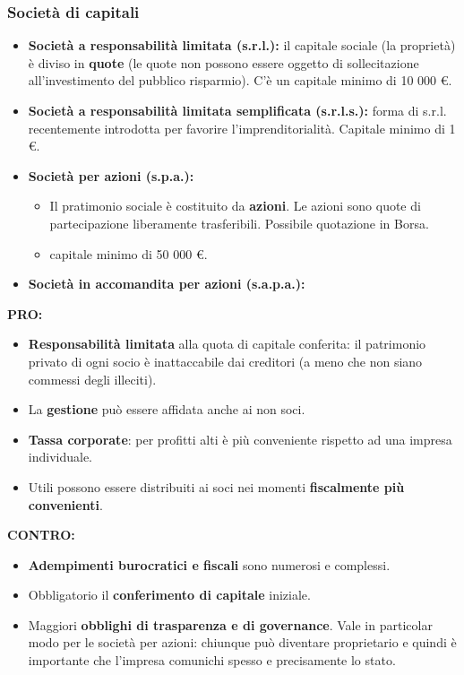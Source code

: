 \documentclass[../main.tex]{subfiles}
\begin{document}
\subsubsection{Società di capitali}

\begin{itemize}
	\item \textbf{Società a responsabilità limitata (s.r.l.):} il capitale sociale (la proprietà) è diviso in \textbf{quote} (le quote non possono essere oggetto di sollecitazione all'investimento del pubblico risparmio). C'è un capitale minimo di 10 000 \euro.

	\item \textbf{Società a responsabilità limitata semplificata (s.r.l.s.):} forma di s.r.l. recentemente introdotta per favorire l'imprenditorialità. Capitale minimo di 1 \euro.

	\item \textbf{Società per azioni (s.p.a.):}

	      \begin{itemize}
		      \item
		            Il pratimonio sociale è costituito da \textbf{azioni}. Le azioni sono quote di partecipazione liberamente trasferibili. Possibile quotazione in Borsa.
		      \item capitale minimo di 50 000 \euro.
	      \end{itemize}

	\item \textbf{Società in accomandita per azioni (s.a.p.a.):}

\end{itemize}

\textbf{PRO:}
\begin{itemize}
	\item \textbf{Responsabilità limitata} alla quota di capitale conferita: il patrimonio privato di ogni socio è inattaccabile dai creditori (a meno che non siano commessi degli illeciti).
	\item La \textbf{gestione} può essere affidata anche ai non soci.
	\item \textbf{Tassa corporate}: per profitti alti è più conveniente rispetto ad una impresa individuale.
	\item Utili possono essere distribuiti ai soci nei momenti \textbf{fiscalmente più convenienti}.

\end{itemize}

\textbf{CONTRO:}
\begin{itemize}
	\item \textbf{Adempimenti burocratici e fiscali} sono numerosi e complessi.
	\item Obbligatorio il \textbf{conferimento di capitale} iniziale.
	\item Maggiori \textbf{obblighi di trasparenza e di governance}. Vale in particolar modo per le società per azioni: chiunque può diventare proprietario e quindi è importante che l'impresa comunichi spesso e precisamente lo stato.

\end{itemize}
\end{document}
